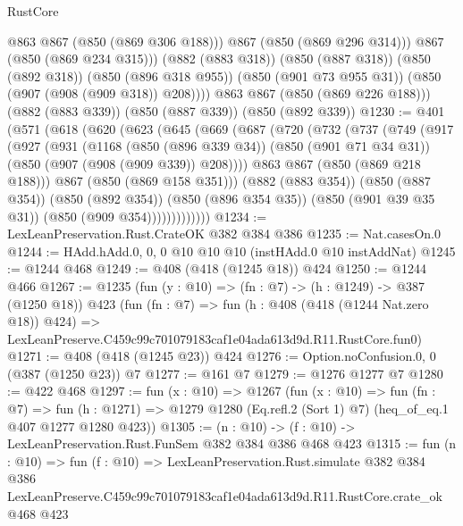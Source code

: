 \begin{lexlean}{RustCore}
\begin{coremodule}
                @863
                @867
                (@850 (@869 @306 @188)))
              @867
              (@850 (@869 @296 @314)))
            @867
            (@850 (@869 @234 @315)))
          (@882 (@883 @318))
          (@850 (@887 @318))
          (@850 (@892 @318))
          (@850 (@896 @318 @955))
          (@850 (@901 @73 @955 @31))
          (@850 (@907 (@908 (@909 @318)) @208))))
      @863
      @867
      (@850 (@869 @226 @188)))
    (@882 (@883 @339))
    (@850 (@887 @339))
    (@850 (@892 @339))
@1230 := @401
    (@571
      (@618
        (@620
          (@623
            (@645
              (@669
                (@687
                  (@720
                    (@732
                      (@737
                        (@749
                          (@917
                            (@927
                              (@931
                                (@1168
                                  (@850 (@896 @339 @34))
                                  (@850 (@901 @71 @34 @31))
                                  (@850 (@907 (@908 (@909 @339)) @208))))
                              @863
                              @867
                              (@850 (@869 @218 @188)))
                            @867
                            (@850 (@869 @158 @351)))
                          (@882 (@883 @354))
                          (@850 (@887 @354))
                          (@850 (@892 @354))
                          (@850 (@896 @354 @35))
                          (@850 (@901 @39 @35 @31))
                          (@850 (@909 @354)))))))))))))
@1234 := LexLeanPreservation.Rust.CrateOK @382 @384 @386
@1235 := Nat.casesOn.{0}
@1244 := HAdd.hAdd.{0, 0, 0} @10 @10 @10 (instHAdd.{0} @10 instAddNat)
@1245 := @1244 @468
@1249 := @408 (@418 (@1245 @18)) @424
@1250 := @1244 @466
@1267 := @1235
    (fun (y : @10) => (fn : @7) -> (h : @1249) -> @387 (@1250 @18))
    @423
    (fun (fn : @7) =>
    fun (h : @408 (@418 (@1244 Nat.zero @18)) @424) =>
    LexLeanPreserve.C459c99c701079183caf1e04ada613d9d.R11.RustCore.fun0)
@1271 := @408 (@418 (@1245 @23)) @424
@1276 := Option.noConfusion.{0, 0} (@387 (@1250 @23)) @7
@1277 := @161 @7
@1279 := @1276 @1277 @7
@1280 := @422 @468
@1297 := fun (x : @10) =>
  @1267
    (fun (x : @10) =>
    fun (fn : @7) =>
    fun (h : @1271) => @1279 @1280 (Eq.refl.{2} (Sort 1) @7) (heq_of_eq.{1} @407 @1277 @1280 @423))
@1305 := (n : @10) -> (f : @10) -> LexLeanPreservation.Rust.FunSem @382 @384 @386 @468 @423
@1315 := fun (n : @10) =>
  fun (f : @10) =>
  LexLeanPreservation.Rust.simulate
    @382
    @384
    @386
    LexLeanPreserve.C459c99c701079183caf1e04ada613d9d.R11.RustCore.crate_ok
    @468
    @423
\end{coremodule}
\end{lexlean}
